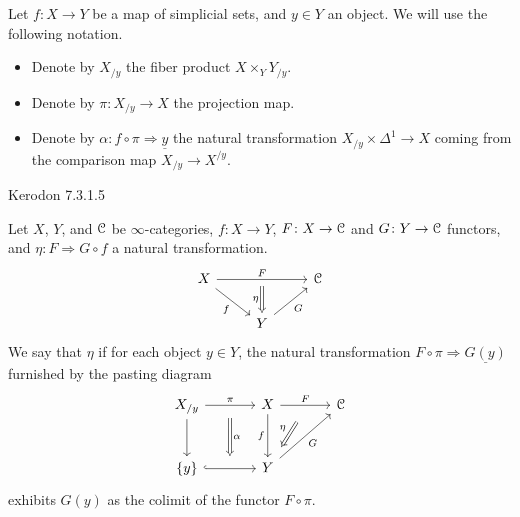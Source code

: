 \documentclass[main.tex]{subfiles}
\begin{document}
\begin{notation}
  \label{notation:rund_um_undercategories}
  Let $f\colon X \to Y$ be a map of simplicial sets, and $y \in Y$ an object. We will use the following notation.
  \begin{itemize}
    \item Denote by $X_{/y}$ the fiber product $X \times_{Y} Y_{/y}$.

    \item Denote by $\pi\colon X_{/y} \to X$ the projection map.

    \item Denote by $\alpha\colon f \circ \pi \Rightarrow \underline{y}$ the natural transformation $X_{/y} \times \Delta^{1} \to X$ coming from the comparison map $X_{/y} \to X^{/y}$.
  \end{itemize}
\end{notation}

Kerodon 7.3.1.5
\begin{definition}
  \label{def:nat_xfo_exhibiting_left_kan_ext}
  Let $X$, $Y$, and $\mathcal{C}$ be $\infty$-categories, $f\colon X \to Y$, $F\colon X \to \mathcal{C}$ and $G\colon Y \to \mathcal{C}$ functors, and $\eta\colon F \Rightarrow G \circ f$ a natural transformation.
  \begin{equation*}
    \begin{tikzcd}
      X
      \arrow[dr, swap, "f"]
      \arrow[rr, "F", ""{below, name=M}]
      && \category{C}
      \\
      & Y
      \arrow[ur, swap, "G"]
      \arrow[from=M, Rightarrow, swap, "\eta"]
    \end{tikzcd}
  \end{equation*}
  We say that $\eta$  if for each object $y \in Y$, the natural transformation $F \circ \pi \Rightarrow \underline{G(y)}$ furnished by the pasting diagram
  \begin{equation*}
    \begin{tikzcd}[row sep=large, column sep=large]
      X_{/y}
      \arrow[r, "\pi", ""{name=LA, swap}]
      \arrow[d, ""{name=LD}]
      & X
      \arrow[d, swap, "f"]
      \arrow[r, "F", ""{below, name=M}]
      & \category{C}
      \\
      \{y\}
      \arrow[r, hook, ""{name=LB}]
      & Y
      \arrow[ur, swap, "G"]
      \arrow[from=M, Rightarrow, shorten=2ex, swap, "\eta"]
      \arrow[from=LA, to=LB, Rightarrow, shorten=1ex, "\alpha"]
    \end{tikzcd}
  \end{equation*}
  exhibits $G(y)$ as the colimit of the functor $F \circ \pi$.
\end{definition}
\end{document}
